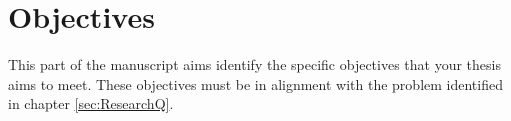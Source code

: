 \chapter{Objectives}

This part of the manuscript aims identify the specific objectives that your thesis aims to meet. These objectives must be in alignment with the problem identified in chapter \ref{sec:ResearchQ}.